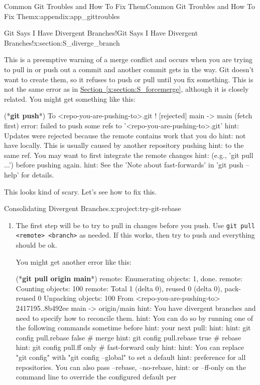 \documentclass[oneside,10pt,]{book}
\newcommand{\xreffont}{\relax}
\newcommand{\mono}[1]{\texttt{#1}}
\newcommand{\consoleinput}[1]{\textbf{#1}}
\begin{document}
\begin{appendixptx}{Common Git Troubles and How To Fix Them}{}{Common Git Troubles and How To Fix Them}{}{}{x:appendix:app_gittroubles}
\begin{sectionptx}{Git Says I Have Divergent Branches!}{}{Git Says I Have Divergent Branches!}{}{}{x:section:S_diverge_branch}
\par
This is a preemptive warning of a merge conflict and occurs when you are trying to pull in or push out a commit and another commit gets in the way. Git doesn't want to create them, so it refuses to push or pull until you fix something. This is not the same error as in \hyperref[x:section:S_forcemerge]{Section~{\xreffont\ref{x:section:S_forcemerge}}}, although it is closely related. You might get something like this: \begin{console}{0}{1}{0}
(*\consoleinput{git push}*)
To <repo-you-are-pushing-to>.git
 ! [rejected]        main -> main (fetch first)
error: failed to push some refs to '<repo-you-are-pushing-to>.git'
hint: Updates were rejected because the remote contains work that you do
hint: not have locally. This is usually caused by another repository pushing
hint: to the same ref. You may want to first integrate the remote changes
hint: (e.g., 'git pull ...') before pushing again.
hint: See the 'Note about fast-forwards' in 'git push --help' for details.
\end{console}
 This looks kind of scary. Let's see how to fix this.%
\begin{project}{Consolidating Divergent Branches.}{x:project:try-git-rebase}%
\begin{enumerate}[font=\bfseries,label=(\alph*),ref=\alph*]
\item{}The first step will be to try to pull in changes before you push. Use \mono{git pull <remote> <branch>} as needed. If this works, then try to push and everything should be ok.%
\par
You might get another error like this: \begin{console}{0}{1}{0}
(*\consoleinput{git pull origin main}*)
remote: Enumerating objects: 1, done.
remote: Counting objects: 100%
remote: Total 1 (delta 0), reused 0 (delta 0), pack-reused 0
Unpacking objects: 100%
From <repo-you-are-pushing-to>
   2417195..8b492ee  main       -> origin/main
hint: You have divergent branches and need to specify how to reconcile them.
hint: You can do so by running one of the following commands sometime before
hint: your next pull:
hint: 
hint:   git config pull.rebase false  # merge
hint:   git config pull.rebase true   # rebase
hint:   git config pull.ff only       # fast-forward only
hint: 
hint: You can replace "git config" with "git config --global" to set a default
hint: preference for all repositories. You can also pass --rebase, --no-rebase,
hint: or --ff-only on the command line to override the configured default per

\end{console}
\end{enumerate}
\end{project}
\end{sectionptx}
\end{appendixptx}
\end{document}
